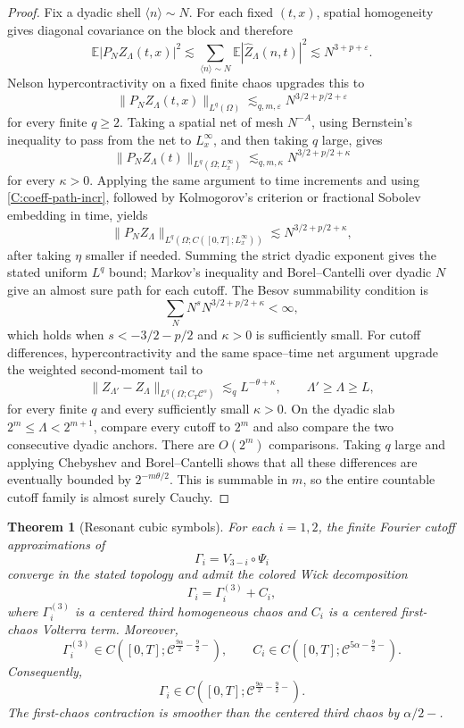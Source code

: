 \documentclass[10pt]{amsart}
\numberwithin{equation}{section}
\theoremstyle{plain}
\newtheorem{theorem}{Theorem}[section]
\theoremstyle{definition}
\theoremstyle{remark}
\newcommand{\E}{\mathbb{E}}
\newcommand{\C}{\mathcal{C}}
\newcommand{\eps}{\varepsilon}
\newcommand{\la}{\langle}
\newcommand{\ra}{\rangle}
\newcommand{\wh}{\widehat}
\begin{document}
\begin{proof}
Fix a dyadic shell \(\la n\ra\sim N\).  For each fixed \((t,x)\), spatial homogeneity gives diagonal covariance on the block and therefore
\[
        \E|P_NZ_\Lambda(t,x)|^2
        \lesssim
        \sum_{\la n\ra\sim N}\E|\wh Z_\Lambda(n,t)|^2
        \lesssim N^{3+p+\eps}.
\]
Nelson hypercontractivity on a fixed finite chaos upgrades this to
\[
        \|P_NZ_\Lambda(t,x)\|_{L^q(\Omega)}
        \lesssim_{q,m,\eps}N^{3/2+p/2+\eps}
\]
for every finite \(q\ge2\).  Taking a spatial net of mesh \(N^{-A}\), using Bernstein's inequality to pass from the net to \(L^\infty_x\), and then taking \(q\) large, gives
\[
        \|P_NZ_\Lambda(t)\|_{L^q(\Omega;L^\infty_x)}
        \lesssim_{q,m,\kappa} N^{3/2+p/2+\kappa}
\]
for every \(\kappa>0\).  Applying the same argument to time increments and using \eqref{C:coeff-path-incr}, followed by Kolmogorov's criterion or fractional Sobolev embedding in time, yields
\[
        \|P_NZ_\Lambda\|_{L^q(\Omega;C([0,T];L^\infty_x))}
        \lesssim N^{3/2+p/2+\kappa},
\]
after taking \(\eta\) smaller if needed.  Summing the strict dyadic exponent gives the stated uniform $L^q$ bound; Markov's inequality and Borel--Cantelli over dyadic \(N\) give an almost sure path for each cutoff.  The Besov summability condition is
\[
        \sum_N N^sN^{3/2+p/2+\kappa}<\infty,
\]
which holds when \(s<-3/2-p/2\) and \(\kappa>0\) is sufficiently small.  For cutoff differences, hypercontractivity and the same space--time net argument upgrade the weighted second-moment tail to
\[
 \|Z_{\Lambda'}-Z_\Lambda\|_{L^q(\Omega;C_T\mathcal C^s)}
 \lesssim_q L^{-\theta+\kappa},
 \qquad \Lambda'\ge\Lambda\ge L,
\]
for every finite $q$ and every sufficiently small $\kappa>0$.  On the dyadic slab $2^m\le\Lambda<2^{m+1}$, compare every cutoff to $2^m$ and also compare the two consecutive dyadic anchors.  There are $O(2^m)$ comparisons.  Taking $q$ large and applying Chebyshev and Borel--Cantelli shows that all these differences are eventually bounded by $2^{-m\theta/2}$.  This is summable in $m$, so the entire countable cutoff family is almost surely Cauchy.
\end{proof}

\begin{theorem}[Resonant cubic symbols]\label{thm:C-cubic}
For each \(i=1,2\), the finite Fourier cutoff approximations of
\[
        \Gamma_i=V_{3-i}\circ\Psi_i
\]
converge in the stated topology and admit the colored Wick decomposition
\[
        \Gamma_i=\Gamma_i^{(3)}+C_i,
\]
where \(\Gamma_i^{(3)}\) is a centered third homogeneous chaos and \(C_i\) is a centered first-chaos Volterra term.  Moreover,
\[
        \Gamma_i^{(3)}\in C([0,T];\C^{\frac{9\alpha}{2}-\frac92-}),
        \qquad
        C_i\in C([0,T];\C^{5\alpha-\frac92-}).
\]
Consequently,
\[
        \Gamma_i\in C([0,T];\C^{\frac{9\alpha}{2}-\frac92-}).
\]
The first-chaos contraction is smoother than the centered third chaos by \(\alpha/2-\).
\end{theorem}
\end{document}
